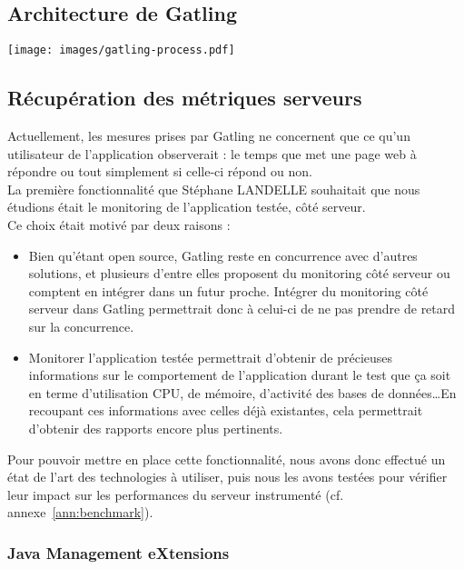 \subsection{Architecture de Gatling}

\begin{center}
	\texttt{[image: images/gatling-process.pdf]}
\end{center}

\subsection{Récupération des métriques serveurs}

Actuellement, les mesures prises par Gatling ne concernent que ce qu'un utilisateur de l'application observerait : le temps que met une page web à répondre ou tout simplement si celle-ci répond ou non.\\

La première fonctionnalité que Stéphane LANDELLE souhaitait que nous étudions était le monitoring de l'application testée, côté serveur.\\

Ce choix était motivé par deux raisons :

\begin{itemize}
	\item Bien qu'étant open source, Gatling reste en concurrence avec d'autres solutions, et plusieurs d'entre elles proposent du monitoring côté serveur ou comptent en intégrer dans un futur proche. Intégrer du monitoring c\^oté serveur  dans Gatling permettrait donc à celui-ci de ne pas prendre de retard sur la concurrence.
	\item Monitorer l'application testée permettrait d'obtenir de précieuses informations sur le comportement de l'application durant le test que ça soit en terme d'utilisation CPU, de mémoire, d'activité des bases de données\ldots En recoupant ces informations avec celles déjà existantes, cela permettrait d'obtenir des rapports encore plus pertinents.\\
\end{itemize}

Pour pouvoir mettre en place cette fonctionnalité, nous avons donc effectué un état de l'art des technologies à utiliser, puis nous les avons testées pour vérifier leur impact sur les performances du serveur instrumenté (cf. annexe~\ref{ann:benchmark}).\\

\subsubsection{Java Management eXtensions}

